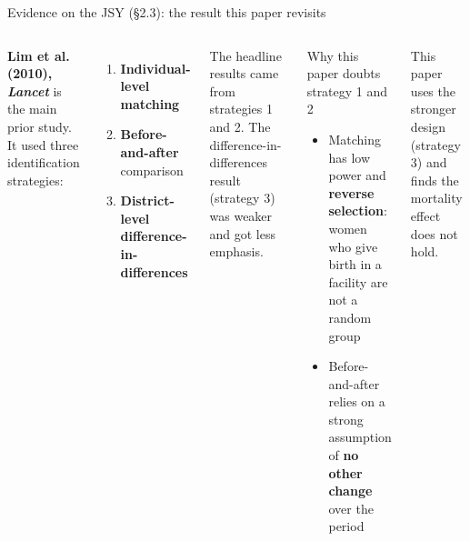 \documentclass[aspectratio=169,11pt]{beamer}
\begin{document}
\begin{frame}{Evidence on the JSY (\S2.3): the result this paper revisits}
  \begin{columns}[T]
    \textbf{Lim et al. (2010), \emph{Lancet}} is the main prior study. It used three identification strategies:
    \begin{enumerate}
      \item \textbf{Individual-level matching}
      \item \textbf{Before-and-after} comparison
      \item \textbf{District-level difference-in-differences}
    \end{enumerate}
    \vspace{0.2em}
    {\footnotesize The headline results came from strategies 1 and 2. The difference-in-differences result (strategy 3) was weaker and got less emphasis.}
    \begin{alertblock}{Why this paper doubts strategy 1 and 2}
      {\footnotesize
      \begin{itemize}
        \item Matching has low power and \textbf{reverse selection}: women who give birth in a facility are not a random group
        \item Before-and-after relies on a strong assumption of \textbf{no other change} over the period
      \end{itemize}}
    \end{alertblock}
    {\footnotesize This paper uses the stronger design (strategy 3) and finds the mortality effect does not hold.}
  \end{columns}
\end{frame}

\end{document}
